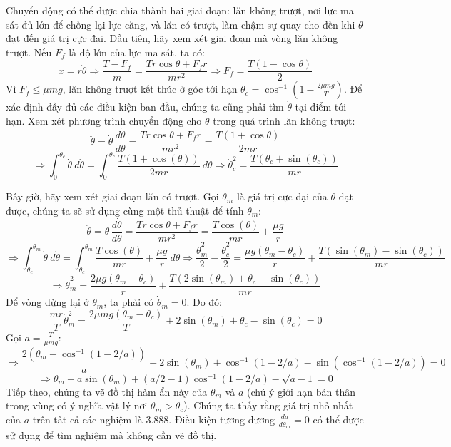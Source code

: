 \begin{solution}
Chuyển động có thể được chia thành hai giai đoạn: lăn không trượt, nơi lực ma sát đủ lớn để chống lại lực căng, và lăn có trượt, làm chậm sự quay cho đến khi $\theta$ đạt đến giá trị cực đại. Đầu tiên, hãy xem xét giai đoạn mà vòng lăn không trượt. Nếu $F_f$ là độ lớn của lực ma sát, ta có:
$$\ddot{x} = r\ddot{\theta} \Longrightarrow \frac{T - F_f}{m} = \frac{Tr\cos\theta + F_f r}{mr^2}\Longrightarrow F_f = \frac{T(1-\cos\theta)}{2}$$
Vì $F_f\leq\mu mg$, lăn không trượt kết thúc ở góc tới hạn $\displaystyle\theta_c = \cos^{-1}\left(1 - \frac{2\mu mg}{T}\right)$. Để xác định đầy đủ các điều kiện ban đầu, chúng ta cũng phải tìm $\dot{\theta}$ tại điểm tới hạn. Xem xét phương trình chuyển động cho $\theta$ trong quá trình lăn không trượt:
$$\ddot{\theta} = \dot{\theta}\,\frac{d\dot{\theta}}{d\theta}= \frac{Tr\cos\theta + F_f r}{mr^2} = \frac{T(1+\cos\theta)}{2mr}$$
$$\Rightarrow \int_{0}^{\theta_c}\dot{\theta}\ d\dot{\theta} = \int_0^{\theta_c}\frac{T(1+\cos(\theta))}{2mr}\ d\theta\Rightarrow \dot{\theta}_c^2 = \frac{T(\theta_c +\sin(\theta_c))}{mr}$$

Bây giờ, hãy xem xét giai đoạn lăn có trượt. Gọi $\theta_m$ là giá trị cực đại của $\theta$ đạt được, chúng ta sẽ sử dụng cùng một thủ thuật để tính $\dot{\theta}_m$:
$$\ddot{\theta} = \dot{\theta}\,\frac{d\dot{\theta}}{d\theta}= \frac{Tr\cos\theta + F_f r}{mr^2} = \frac{T\cos(\theta)}{mr} + \frac{\mu g}{r}$$
$$\Rightarrow \int_{\theta_c}^{\theta_m}\dot{\theta}\ d\dot{\theta} = \int_{\theta_c}^{\theta_m}\frac{T\cos(\theta)}{mr} + \frac{\mu g}{r}\ d\theta\Rightarrow \frac{\dot{\theta}_{m}^2}{2} - \frac{\dot{\theta}^2_c}{2} = \frac{\mu g(\theta_m - \theta_c)}{r} + \frac{T(\sin(\theta_m) - \sin(\theta_c))}{mr}$$
$$\Rightarrow \dot{\theta}_{m}^2 =  \frac{2\mu g(\theta_m - \theta_c)}{r} + \frac{T(2\sin(\theta_m) + \theta_c-\sin(\theta_c))}{mr}$$
Để vòng dừng lại ở $\theta_m$, ta phải có $\dot{\theta}_{m} = 0$. Do đó:
$$\frac{mr}{T}\dot{\theta}_{m}^2 = \frac{2\mu mg(\theta_m-\theta_c)}{T} + 2\sin(\theta_m) +\theta_c - \sin(\theta_c) = 0$$
Gọi $\displaystyle a = \frac{T}{\mu mg}$:
$$\Rightarrow \frac{2(\theta_m - \cos^{-1}(1 - 2/a))}{a} + 2\sin(\theta_m) + \cos^{-1}(1-2/a) - \sin(\cos^{-1}(1 - 2/a)) = 0$$
$$\Rightarrow \theta_m + a\sin(\theta_m) + (a/2 - 1)\cos^{-1}(1-2/a) - \sqrt{a-1} = 0$$
Tiếp theo, chúng ta vẽ đồ thị hàm ẩn này của $\theta_m$ và $a$ (chú ý giới hạn bản thân trong vùng có ý nghĩa vật lý nơi $\theta_m > \theta_c$). Chúng ta thấy rằng giá trị nhỏ nhất của $a$ trên tất cả các nghiệm là $\boxed{3.888}$. Điều kiện tương đương $\displaystyle\frac{da}{d\theta_m}=0$ có thể được sử dụng để tìm nghiệm mà không cần vẽ đồ thị.
\end{solution}
